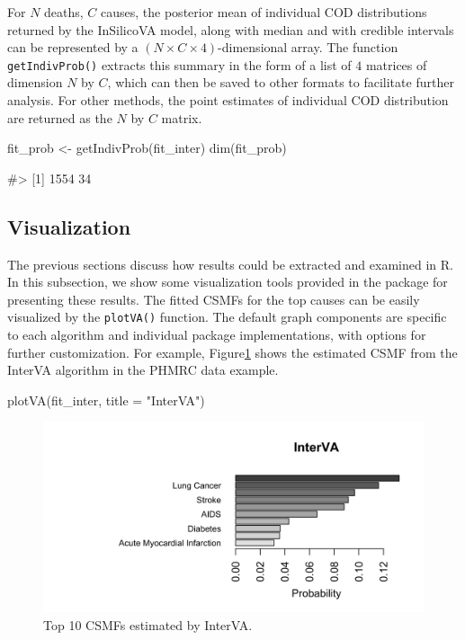 For \(N\) deaths, \(C\) causes, the posterior mean of individual COD
distributions returned by the InSilicoVA model, along with median and
with credible intervals can be represented by a
\((N \times C \times 4)\)-dimensional array. The function
\texttt{getIndivProb()} extracts this summary in the form of a list of
\(4\) matrices of dimension \(N\) by \(C\), which can then be saved to
other formats to facilitate further analysis. For other methods, the
point estimates of individual COD distribution are returned as the \(N\)
by \(C\) matrix.

\begin{Schunk}
\begin{Sinput}
fit_prob <- getIndivProb(fit_inter)
dim(fit_prob)
\end{Sinput}
\begin{Soutput}
#> [1] 1554   34
\end{Soutput}
\end{Schunk}

\hypertarget{visualization}{%
\subsection{Visualization}\label{visualization}}

The previous sections discuss how results could be extracted and
examined in R. In this subsection, we show some visualization tools
provided in the  package for presenting these results.
The fitted CSMFs for the top causes can be easily visualized by the
\texttt{plotVA()} function. The default graph components are specific to
each algorithm and individual package implementations, with options for
further customization. For example, Figure\ref{fig:vis-1} shows the
estimated CSMF from the InterVA algorithm in the PHMRC data example.

\begin{Schunk}
\begin{Sinput}
plotVA(fit_inter, title = "InterVA")
\end{Sinput}
\begin{figure}[!h]

{\centering \includegraphics[width=0.8\linewidth,]{openVA-RJ-R1_files/figure-latex/vis-1-1} 

}

\caption[Top 10 CSMFs estimated by InterVA]{Top 10 CSMFs estimated by InterVA.}\label{fig:vis-1}
\end{figure}
\end{Schunk}

